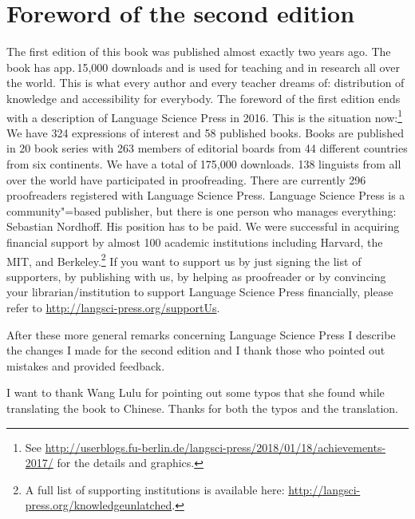 
\section*{Foreword of the second edition}

\addlines[1]
The first edition of this book was published almost exactly two years ago. The book has app.\,15,000
downloads and is used for teaching and in research all over the world. This is what every author and
every teacher dreams of: distribution of knowledge and accessibility for everybody. The foreword of
the first edition ends with a description of Language Science Press in 2016. This is the situation
now:\footnote{%
  See \url{http://userblogs.fu-berlin.de/langsci-press/2018/01/18/achievements-2017/} for the
  details and graphics.
} We have 324 expressions of interest and 58 published books. Books are published in 20 book series with 263 members of editorial boards from 44
different countries from six continents. We have a total of 175,000 downloads. 138 linguists from
all over the world have participated in proofreading. There are currently 296 proofreaders
registered with Language Science Press. Language Science Press is a community"=based publisher, but
there is one person who manages everything: Sebastian Nordhoff. His
position has to be paid. We were successful in acquiring financial support by almost 100 academic institutions including 
Harvard, the MIT, and Berkeley.\footnote{%
  A full list of supporting institutions is available here:
  \url{http://langsci-press.org/knowledgeunlatched}.
}
If you want to support us by just signing the list of supporters, by publishing with us, by helping as proofreader or by
convincing your librarian/institution to support Language Science Press financially, please refer to \url{http://langsci-press.org/supportUs}.



After these more general remarks concerning Language Science Press I describe the changes I made for the second edition and I
thank those who pointed out mistakes and provided feedback.

I want to thank Wang Lulu for pointing out some typos that she found while translating the book to
Chinese. Thanks for both the typos and the translation.

